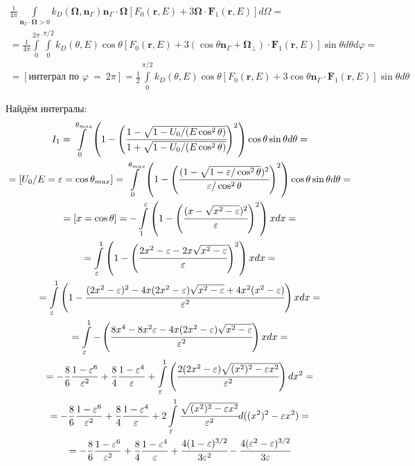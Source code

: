 \documentclass[a4paper,12pt]{article} %
\renewcommand{\vec}[1]{\bm{#1}}
\newcommand{\eps}{\varepsilon}
\renewcommand{\phi}{\varphi}
\begin{document}
\begin{equation}
\begin{gathered}
    \frac{1}{4\pi} \int\limits_{\vec{n}_\Gamma \cdot \vec{\Omega}>0} k_D(\vec{\Omega}, \vec{n}_\Gamma) \vec{n}_\Gamma \cdot \vec{\Omega} [F_0(\vec{r}, E) + 3\vec{\Omega}\cdot\vec{F}_1(\vec{r}, E)]d\Omega = \\
    =
    \frac{1}{4\pi}
    \int\limits_{0}^{2\pi}
    \int\limits_{0}^{\pi/2}
     k_D(\theta, E) \cos \theta [F_0(\vec{r}, E) + 3(\cos \theta \vec{n}_\Gamma + \vec{\Omega}_\perp)\cdot \vec{F}_1(\vec{r}, E)]
     \sin \theta d\theta d\phi = \\
     =
     [\text{интеграл по }\phi~=~2\pi] =
     \frac{1}{2}
     \int\limits_{0}^{\pi/2}
     k_D(\theta, E) \cos \theta [F_0(\vec{r}, E) + 3 \cos \theta \vec{n}_\Gamma \cdot \vec{F}_1(\vec{r}, E)]
     \sin \theta d\theta
\end{gathered}
\end{equation}

Найдём интегралы:
\begin{equation}
\begin{gathered}
    I_1 =
    \int\limits_{0}^{\theta_{max}}
    \left(1 - \Bigg(\cfrac{1 - \sqrt{1 - U_0/(E  \cos^2 \theta)}}{1 + \sqrt{1 - U_0/(E  \cos^2 \theta)}}\Bigg)^2\right) \cos \theta \sin \theta d\theta = \\
    = [U_0/E = \eps = \cos \theta_{max}] =
    \int\limits_{0}^{\theta_{max}}
    \left(1 - \Bigg(\cfrac{(1 - \sqrt{1 - \eps/\cos^2 \theta})^2}{\eps/ \cos^2 \theta}\Bigg)^2\right) \cos \theta \sin \theta d\theta = \\
    = [x = \cos \theta] =
    - \int\limits_{1}^{\eps}
    \left(1 - \Bigg(\cfrac{(x - \sqrt{x^2 - \eps})^2}{\eps}\Bigg)^2\right) x dx = \\
    =
    \int\limits_{\eps}^{1}
    \left(1 - \Bigg(\cfrac{2 x^2 - \eps - 2 x \sqrt{x^2 - \eps} }{\eps}\Bigg)^2\right) x dx = \\
    =
    \int\limits_{\eps}^{1}
    \left(1 - \cfrac{(2 x^2 - \eps)^2 - 4 x (2 x^2 - \eps) \sqrt{x^2 - \eps} + 4x^2(x^2 - \eps) }{\eps^2}\right) x dx = \\
    =
    \int\limits_{\eps}^{1}
    -\left(\cfrac{8x^4 - 8 x^2 \eps - 4 x (2 x^2 - \eps) \sqrt{x^2 - \eps}}{\eps^2}\right) x dx
    = \\ =
    - \frac{8}{6} \frac{1 - \eps^6}{\eps^2}
    + \frac{8}{4} \frac{1 - \eps^4}{\eps}
    + \int\limits_{\eps}^{1}
    \left(\cfrac{2 (2 x^2 - \eps) \sqrt{(x^2)^2 - \eps x^2}}{\eps^2}\right) dx^2 = \\ =
    - \frac{8}{6} \frac{1 - \eps^6}{\eps^2}
    + \frac{8}{4} \frac{1 - \eps^4}{\eps}
    + 2 \int\limits_{\eps}^{1}
    \cfrac{\sqrt{(x^2)^2 - \eps x^2}}{\eps^2} d((x^2)^2 - \eps x^2) = \\ =
    - \frac{8}{6} \frac{1 - \eps^6}{\eps^2}
    + \frac{8}{4} \frac{1 - \eps^4}{\eps}
    + \cfrac{4 (1 - \eps)^{3/2}}{ 3 \eps^2}
    - \cfrac{4 (\eps^2- \eps)^{3/2}}{ 3 \eps}
\end{gathered}
\end{equation}
\end{document}
